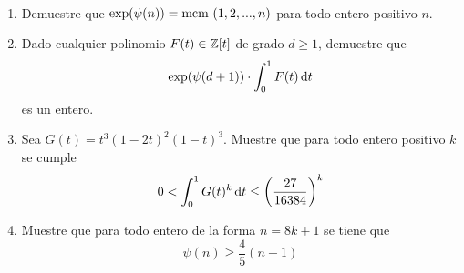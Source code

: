 \begin{prob}[2 pts. c/u]
	\
	\begin{enumerate}[label = \roman*]
		\item Demuestre que $\exp(\psi(n))=\text{mcm }(1,2,...,n)$ para todo entero positivo $n$.

		\item Dado cualquier polinomio $F(t)\in\mathbb{Z}[t]$ de grado $d\geq 1$, demuestre que
		      \[\exp(\psi(d+1))\cdot\int^1_0F(t)\operatorname{d}\!{t}\]
		      es un entero.

		\item Sea $G(t)=t^3(1-2t)^2(1-t)^3$. Muestre que para todo entero positivo $k$ se cumple
		      \[0<\int^1_0G(t)^k\operatorname{d}\!{t}\leq\left(\frac{27}{16384}\right)^k\]

		\item Muestre que para todo entero de la forma $n=8k+1$ se tiene que
		      \[\psi(n)\geq\frac45(n-1)\]
	\end{enumerate}
\end{prob}

